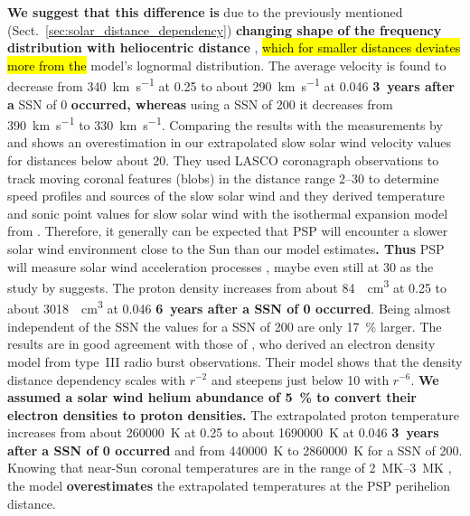 \textbf{We suggest that this difference is} due to the previously mentioned (Sect.~\ref{sec:solar_distance_dependency}) \textbf{changing shape of the frequency distribution with heliocentric distance} , \hl{which for smaller distances deviates more from the } model’s lognormal distribution.
The average velocity is found to decrease from \SI{340}{\km\per\s} at \SI{0.25}{\au} to about \SI{290}{\km\per\s} at \SI{0.046}{\au} \textbf{3~years after a} SSN of 0 \textbf{occurred, whereas} using a SSN of 200 it decreases from \SI{390}{\km\per\s} to \SI{330}{\km\per\s}. Comparing the results with the measurements by \citet{Sheeley1997} and \citet{Wang2000} shows an overestimation in our extrapolated slow solar wind velocity values for distances below about \SI{20}{\Rs}. They used LASCO coronagraph observations to track moving coronal features (blobs) in the distance range \SIrange{2}{30}{\Rs} to determine speed profiles and sources of the slow solar wind and they derived temperature and sonic point values for slow solar wind with the isothermal expansion model from \citet{Parker1958}. Therefore, it generally can be expected that PSP will encounter a slower solar wind environment close to the Sun than our model estimates\textbf{. Thus} PSP will measure solar wind acceleration processes \citep{McComas2008}, maybe even still at \SI{30}{\Rs} as the study by \citet{Sheeley1997} suggests.
The proton density increases from about \SI{84}{\per\cm\cubed} at \SI{0.25}{\au} to about \SI{3018}{\per\cm\cubed} at \SI{0.046}{\au} \textbf{6~years after a SSN of 0 occurred}. Being almost independent of the SSN the values for a SSN of 200 are only \SI{17}{\%} larger. The results are in good agreement with those of \citet{Leblanc1998}, who derived an electron density model from type~III radio burst observations. Their model shows that the density distance dependency scales with $r^{-2}$ and steepens just below \SI{10}{\Rs} with $r^{-6}$. \textbf{We assumed a solar wind helium abundance of \SI{5}{\%} to convert their electron densities to proton densities.}
The extrapolated proton temperature increases from about \SI{260000}{\K} at \SI{0.25}{\au} to about \SI{1690000}{\K} at \SI{0.046}{\au} \textbf{3~years after a SSN of 0 occurred} and from \SI{440000}{\K} to \SI{2860000}{\K} for a SSN of 200. Knowing that near-Sun coronal temperatures are in the range of \SIrange{2}{3}{\mega\K} \citep{Billings1959,Liebenberg1975}, the model \textbf{overestimates} the extrapolated temperatures at the PSP perihelion distance.

